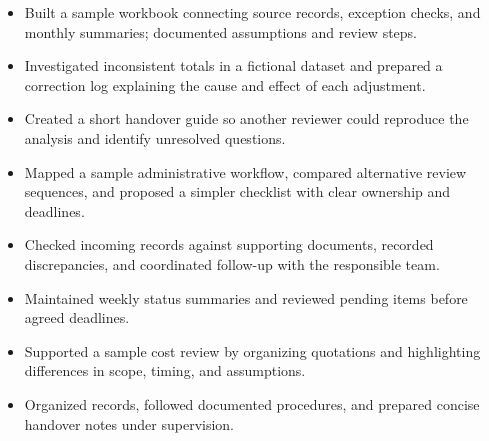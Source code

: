 \begin{cvbody}
\begin{itemize}
\item Built a sample workbook connecting source records, exception checks, and monthly summaries; documented assumptions and review steps.
\item Investigated inconsistent totals in a fictional dataset and prepared a correction log explaining the cause and effect of each adjustment.
\item Created a short handover guide so another reviewer could reproduce the analysis and identify unresolved questions.
\end{itemize}
\vspace{3pt}
\begin{itemize}
\item Mapped a sample administrative workflow, compared alternative review sequences, and proposed a simpler checklist with clear ownership and deadlines.
\end{itemize}
\end{cvbody}

\begin{cvbody}
\begin{itemize}
\item Checked incoming records against supporting documents, recorded discrepancies, and coordinated follow-up with the responsible team.
\item Maintained weekly status summaries and reviewed pending items before agreed deadlines.
\item Supported a sample cost review by organizing quotations and highlighting differences in scope, timing, and assumptions.
\end{itemize}
\vspace{3pt}
\begin{itemize}
\item Organized records, followed documented procedures, and prepared concise handover notes under supervision.
\end{itemize}
\end{cvbody}

